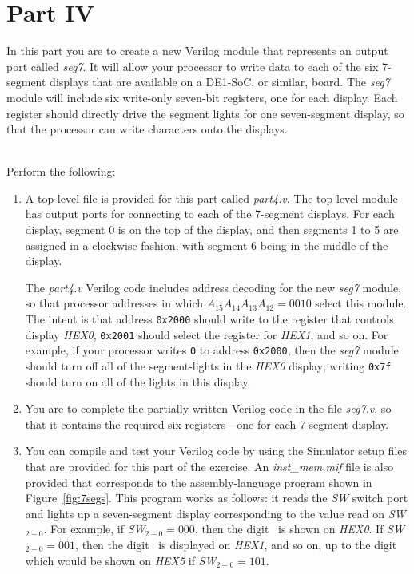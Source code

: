 \documentclass[epsfig,10pt,fullpage]{article} \addtolength{\textwidth}{1.5in}
\newcommand{\red}[1]{{\color{red}\sf{#1}}}
\begin{document}
\section*{Part IV}
In this part you are to create a new Verilog module that represents an output port called 
{\it seg7}. It will allow your processor to write data to each of the six 7-segment
displays that are available on a DE1-SoC, or similar, board. The {\it seg7} module will 
include six write-only seven-bit registers,
one for each display. Each register should directly drive the segment lights for one 
seven-segment display, so that the processor can write characters onto the displays. 

~\\
\noindent
Perform the following:

\begin{enumerate}
\item A top-level file is provided for this part
called {\it part4.v}. The top-level module has output ports for connecting
to each of the 7-segment displays. 
For each display, segment 0 is on the top of the display, and then segments 1 to 5 are assigned
in a clockwise fashion, with segment 6 being in the middle of the display.

The {\it part4.v} Verilog code includes address decoding for the new {\it seg7} module, 
so that processor addresses in which $A_{15} A_{14} A_{13} A_{12} = 0010$ select this module.
The intent is that address \texttt{0x2000} should write to the register that controls 
display {\it HEX0}, \texttt{0x2001} should select the register for {\it HEX1}, and 
so on. For example, if your processor 
writes \texttt{0} to address \texttt{0x2000}, then the {\it seg7} module
should turn off all of the segment-lights in the {\it HEX0} display; writing \texttt{0x7f} 
should turn on all of the lights in this display. 

\item 
You are to complete the partially-written Verilog code in the file {\it seg7.v}, so that
it contains the required six registers---one for each 7-segment display. 
        
\item You can compile and test your Verilog code by using the Simulator setup files that 
are provided for this part of the exercise. An {\it inst\_mem.mif} file is also provided
that corresponds to the assembly-language program shown in 
Figure~\ref{fig:7segs}. This program works as follows: it reads the {\it SW} switch port and 
lights up a seven-segment display corresponding to the value read on {\it SW}$_{2-0}$. For
example, if {\it SW}$_{2-0} = 000$, then the digit~\texttt{\red{0}} is shown on {\it HEX0}.
If {\it SW}$_{2-0} = 001$, then the digit~\texttt{\red{1}} is displayed on {\it HEX1}, 
and so on, up to the digit~\texttt{\red{5}} which would be shown on {\it HEX5} if
{\it SW}$_{2-0} = 101$.


\end{enumerate}
\end{document}
